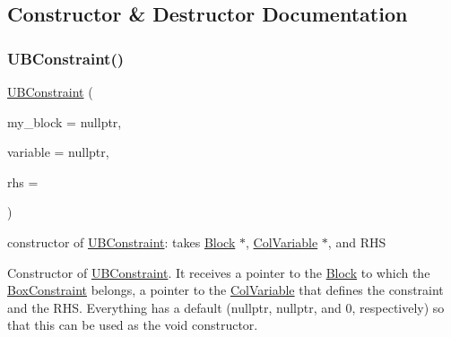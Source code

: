 \subsection{Constructor \& Destructor Documentation}
\mbox{\label{class_s_m_spp__di__unipi__it_1_1_u_b_constraint_ad5071f2d637a23769ab748c14d24c041}} 
\subsubsection{\texorpdfstring{U\+B\+Constraint()}{UBConstraint()}}
{\footnotesize\ttfamily \mbox{\hyperlink{class_s_m_spp__di__unipi__it_1_1_u_b_constraint}{U\+B\+Constraint}} (\begin{DoxyParamCaption}\item[{\mbox{\hyperlink{class_s_m_spp__di__unipi__it_1_1_block}{Block}} $\ast$}]{my\+\_\+block = {\ttfamily nullptr},  }\item[{\mbox{\hyperlink{class_s_m_spp__di__unipi__it_1_1_col_variable}{Col\+Variable}} $\ast$const}]{variable = {\ttfamily nullptr},  }\item[{\mbox{\hyperlink{class_s_m_spp__di__unipi__it_1_1_row_constraint_a34abd4b01d3a2024be5f6d13dd88779f}{c\+\_\+\+R\+H\+S\+Value}}}]{rhs = {} }\end{DoxyParamCaption})\hspace{0.3cm}{\ttfamily [inline]}}



constructor of \mbox{\hyperlink{class_s_m_spp__di__unipi__it_1_1_u_b_constraint}{U\+B\+Constraint}}\+: takes \mbox{\hyperlink{class_s_m_spp__di__unipi__it_1_1_block}{Block}} $\ast$, \mbox{\hyperlink{class_s_m_spp__di__unipi__it_1_1_col_variable}{Col\+Variable}} $\ast$, and R\+HS 

Constructor of \mbox{\hyperlink{class_s_m_spp__di__unipi__it_1_1_u_b_constraint}{U\+B\+Constraint}}. It receives a pointer to the \mbox{\hyperlink{class_s_m_spp__di__unipi__it_1_1_block}{Block}} to which the \mbox{\hyperlink{class_s_m_spp__di__unipi__it_1_1_box_constraint}{Box\+Constraint}} belongs, a pointer to the \mbox{\hyperlink{class_s_m_spp__di__unipi__it_1_1_col_variable}{Col\+Variable}} that defines the constraint and the R\+HS. Everything has a default (nullptr, nullptr, and 0, respectively) so that this can be used as the void constructor. 

